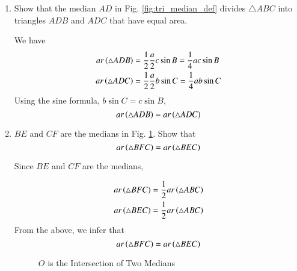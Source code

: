 %
\renewcommand{\theequation}{\theenumi}
\begin{enumerate}[label=\arabic*.,ref=\thesubsection.\theenumi]

%
\item
	Show that the median $AD$ in Fig. \ref{fig:tri_median_def} divides  $\triangle ABC$ into triangles $ADB$ and $ADC$ that have equal area.

\solution We have
%
\begin{align}
ar \left(\triangle ADB\right) &= \frac{1}{2}\frac{a}{2}c \sin B =  \frac{1}{4}ac \sin B \\
ar \left(\triangle ADC\right) &= \frac{1}{2}\frac{a}{2}b \sin C =  \frac{1}{4}ab \sin C 
\end{align}
%
Using the sine formula, $b \sin C = c \sin B$,
\begin{equation}
ar \left(\triangle ADB\right) = ar \left(\triangle ADC\right)
\end{equation}
\item
	$BE$ and $CF$ are the medians in Fig. \ref{ch2_median_ratio}.  Show that
	\begin{equation}
	ar \left(\triangle BFC\right) = ar \left(\triangle BEC\right)
	\end{equation} 
	\label{ch2_median_eq_tri}

\solution Since $BE$ and $CF$ are the medians, 

\begin{align}
ar \left(\triangle BFC\right) &= \frac{1}{2} ar \left(\triangle ABC\right) \\
ar \left(\triangle BEC\right) &= \frac{1}{2} ar \left(\triangle ABC\right) 
\end{align}
From the above, we infer that
%
\begin{equation}
ar \left(\triangle BFC\right) = ar \left(\triangle BEC\right)
\end{equation}


\begin{figure}[!ht]
	\begin{center}
		\resizebox{\columnwidth}{!}{}
	\end{center}
	\caption{$O$ is the Intersection of Two Medians}
	\label{ch2_median_ratio}	
\end{figure}
%
\end{enumerate}
